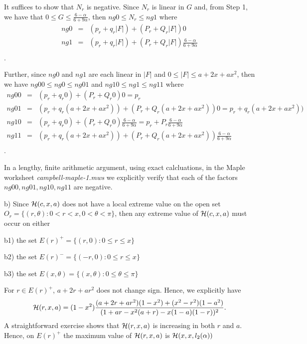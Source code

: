 \documentclass[12pt]{article}
\newcommand{\ds}{\displaystyle}
\begin{document}
It suffices to show that $N_r$ is negative. Since $N_r$ is linear in $G$ and, from Step 1, we have that 
${\ds 0 \le G \le \frac{6-\alpha}{6+9\alpha} }$, then $ng0 \le N_r \le ng1$
where
\begin{eqnarray*}
ng0 &=& (p_r + q_r  |F|) + (P_r + Q_r |F|)0 \\
ng1 &=& (p_r + q_r  |F|) + (P_r + Q_r |F|)\frac{6-\alpha}{6+9\alpha} \\
\end{eqnarray*}.

Further, since $ng0$ and $ng1$ are each linear in $|F|$ and $0 \le |F| \le a + 2x + ax^2$, then we have
$ng00 \le ng0 \le ng01$ and $ng10 \le ng1 \le ng11$
where
\begin{eqnarray*}
ng00 &=& (p_r + q_r 0) + (P_r + Q_r 0)0  = p_r\\
ng01 &=& (p_r + q_r (a + 2x + ax^2)) + (P_r + Q_r (a + 2x + ax^2))0  = p_r + q_r (a + 2x + ax^2)) \\
ng10 &=& (p_r + q_r 0) + (P_r + Q_r 0)\frac{6-\alpha}{6+9\alpha} = p_r + P_r\frac{6-\alpha}{6+9\alpha} \\
ng11 &=& (p_r + q_r (a + 2x + ax^2)) + (P_r + Q_r (a + 2x + ax^2))\frac{6-\alpha}{6+9\alpha} \\
\end{eqnarray*}.

In a lengthy, finite arithmetic argument, using exact calcluations, in the Maple worksheet {\em campbell-maple-1.mws} we explicitly verify that each of the factors $ng00, ng01, ng10, ng11$ are negative.

b) Since ${\cal H}(c,x,a)$ does not have a local extreme value on the open 
set $O_r = \{(r,\theta) : 0 < r < x, 0 < \theta < \pi \}$, then any extreme value of ${\cal H}(c,x,a)$ must occur on either 

b1) the set $E(r)^{+}= \{(r,0) : 0 \le r \le x \}$

b2) the set $E(r)^{-} =\{(-r,0) : 0 \le r \le x \}$

b3) the set $E(x,\theta) = \{(x,\theta) : 0 \le \theta \le \pi \}$

\vspace{0.1in}

For $r \in E(r)^{+}$, $a + 2r + ar^2$ does not change sign.  Hence, we explicitly have
$$
{\cal H}(r,x,a) = (1-x^2)\frac{(a+2r+ar^2)(1-x^2)+(x^2-r^2)(1-a^2)}{( 1 + ar-x^2(a+r) - x(1-a)(1-r) )^2} .
$$
A straightforward exercise shows that ${\cal H}(r,x,a)$ is increasing in both $r$ and $a$.  Hence, 
on $E(r)^{+}$ the maximum value of ${\cal H}(r,x,a)$ is ${\cal H}(x,x,l_2(\alpha))$ 
\end{document}
